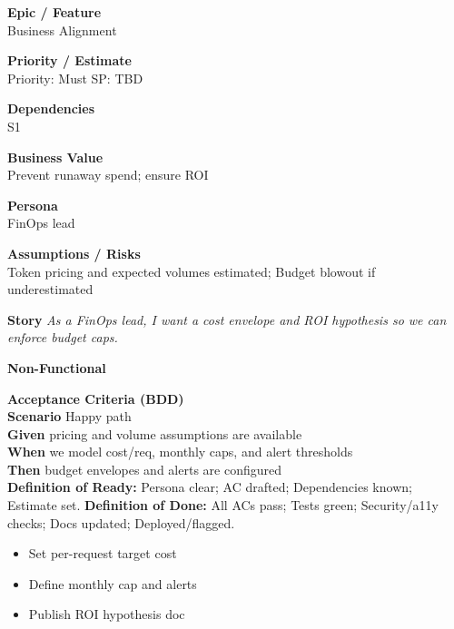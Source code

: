 \documentclass[11pt,a4paper]{article}
\newenvironment{StoryCard}[2][]{
  \begin{tcolorbox}[enhanced, breakable, sharp corners=all, colback=cardback, colframe=cardframe,
    title={#2}, fonttitle=\bfseries\large, boxrule=0.6pt, borderline west={2pt}{0pt}{accent}, #1]
}{
  \end{tcolorbox}
}
\newcommand{\badge}[1]{\pill{\footnotesize #1}}
\newcommand{\cb}{\(\square\)}
\newenvironment{TasksBox}[1][Tasks]{%
  \begin{tcolorbox}[enhanced,breakable,
    colback=cardback, colframe=cardframe, title={#1},
    borderline west={1.8pt}{0pt}{MidnightBlue},
    arc=2pt, boxrule=0.4pt,
    left=10pt,right=10pt,top=6pt,bottom=6pt,
    before skip=6pt, after skip=10pt
  ]
  \small
  \begin{itemize}[label=\cb, leftmargin=*, labelsep=0.6em, itemsep=4pt, topsep=2pt, parsep=0pt]
}{%
  \end{itemize}
  \end{tcolorbox}
}
\begin{document}
\begin{StoryCard}{S3 — Value hypothesis \& ROI guardrails}
\noindent\begin{minipage}[t]{0.49\textwidth}
\textbf{Epic / Feature}\\
Business Alignment

\medskip
\textbf{Priority / Estimate}\\
Priority: Must \quad SP: TBD

\medskip
\textbf{Dependencies}\\
S1
\end{minipage}\hfill
\begin{minipage}[t]{0.49\textwidth}
\textbf{Business Value}\\
Prevent runaway spend; ensure ROI

\medskip
\textbf{Persona}\\
FinOps lead

\medskip
\textbf{Assumptions / Risks}\\
Token pricing and expected volumes estimated; Budget blowout if underestimated
\end{minipage}

\medskip
\textbf{Story} \emph{As a FinOps lead, I want a cost envelope and ROI hypothesis so we can enforce budget caps.}

\medskip
\textbf{Non-Functional}
\badge{Performance}\ \badge{Cost}

\medskip
\textbf{Acceptance Criteria (BDD)}\\
\textbf{Scenario} Happy path\\
\textbf{Given} pricing and volume assumptions are available\\
\textbf{When} we model cost/req, monthly caps, and alert thresholds\\
\textbf{Then} budget envelopes and alerts are configured\\

\medskip
\footnotesize \textbf{Definition of Ready:} Persona clear; AC drafted; Dependencies known; Estimate set.\quad
\textbf{Definition of Done:} All ACs pass; Tests green; Security/a11y checks; Docs updated; Deployed/flagged.
\end{StoryCard}

\begin{TasksBox}[Tasks]
  \item Set per-request target cost
  \item Define monthly cap and alerts
  \item Publish ROI hypothesis doc
\end{TasksBox}
\clearpage
\end{document}
